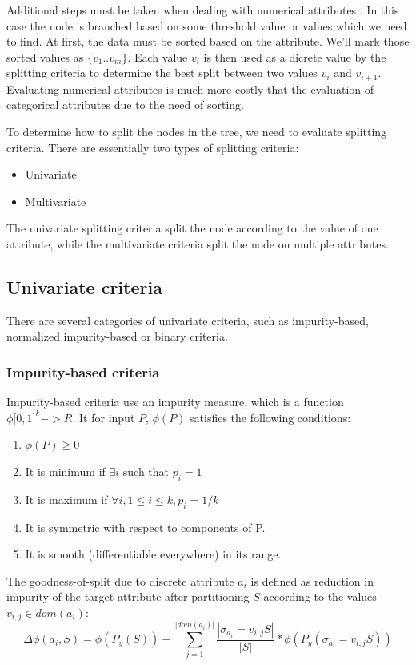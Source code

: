\documentclass[thesis=B,english]{FITthesis}[2012/10/20]
\begin{document}
			Additional steps must be taken when dealing with numerical attributes \cite{C45-NUMERICAL}.	 In this case the node is branched based on some threshold value or values which we need to find. At first, the data must be sorted based on the attribute. We'll mark those sorted values as \(\{v_1..v_m\}\). Each value \(v_i\) is then used as a dicrete value by the splitting criteria to determine the best split between two values \(v_i\) and \(v_{i+1}\). Evaluating numerical attributes is much more costly that the evaluation of categorical attributes due to the need of sorting.

			To determine how to split the nodes in the tree, we need to evaluate splitting criteria. There are essentially two types of splitting criteria:
			\begin{itemize}
			\item Univariate
			\item Multivariate
			\end{itemize}
			The univariate splitting criteria split the node according to the value of one attribute, while the multivariate criteria split the node on multiple attributes.

			\subsection{Univariate criteria}
				There are several categories of univariate criteria, such as impurity-based, normalized impurity-based or binary criteria. \cite{DMWithDecisionTrees}
				\subsubsection{Impurity-based criteria}
				Impurity-based criteria use an impurity measure, which is a function \(\phi\lbrack0,1\rbrack^k->R\). It for input \(P\), \(\phi(P)\) satisfies the following conditions:
				\begin{enumerate}
				\item \(\phi(P) \geq 0\)
				\item It is minimum if \(\exists i\) such that \(p_i = 1\)
				\item It is maximum if \(\forall i, 1 \leq i \leq k, p_i = 1/k\)
				\item It is symmetric with respect to components of P.
				\item It is smooth (differentiable everywhere) in its range.	
				\end{enumerate}
				The goodness-of-split due to discrete attribute \(a_i\) is defined as reduction in impurity of the target attribute after partitioning \(S\) according to the values \(v_{i,j} \in \textit{dom}(a_i)\):
				\[
					\Delta\phi(a_i,S)=\phi(P_y(S))-\sum\limits_{j=1}^{|\textit{dom}(a_i)|}{\frac{|\sigma_{a_i}=v_{i,j}S|}{|S|}*\phi\left(P_y\left(\sigma_{a_i}=v_{i,j}S\right)\right)}
				\]
\end{document}
